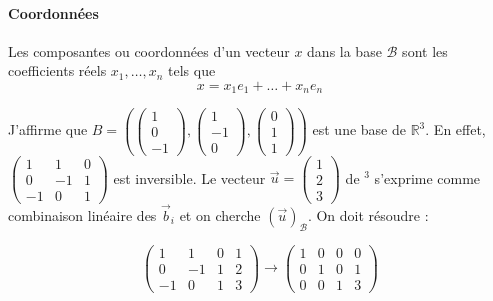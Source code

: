 \paragraph{Coordonnées}
\begin{definition}
    Les composantes ou coordonnées d'un vecteur $x$ dans la base $\mathcal{B}$ sont les coefficients réels $x_1, \dots, x_n$ tels que
    \[x = x_1e_1 + \dots + x_ne_n\]
\end{definition}
J'affirme que $
B = \left(
\begin{pmatrix}
1 \\
0 \\
-1
\end{pmatrix},
\begin{pmatrix}
1 \\
-1 \\
0
\end{pmatrix},
\begin{pmatrix}
0 \\
1 \\
1
\end{pmatrix}
\right)
$ est une base de \(\mathbb{R}^3\). En effet, $\begin{pmatrix}
    1 & 1 & 0 \\
    0 & -1 & 1 \\
    -1 & 0 & 1
\end{pmatrix}$ est inversible. Le vecteur $\vec{u} = \begin{pmatrix}
    1 \\ 2 \\ 3
\end{pmatrix}$ de \R$^3$ s'exprime comme combinaison linéaire des $\vec{b}_i$ et on cherche $(\vec{u})_\mathcal{B}$. On doit résoudre :

\[\left ( \begin{array}{ccc|c}
    1 & 1 & 0 & 1 \\
    0 & -1 & 1 & 2 \\
    -1 & 0 & 1 & 3
\end{array} \right) \to \left (\begin{array}{ccc|c}
    1 & 0 & 0 & 0 \\
    0 & 1 & 0 & 1 \\
    0 & 0 & 1 & 3 
\end{array}\right )\]

